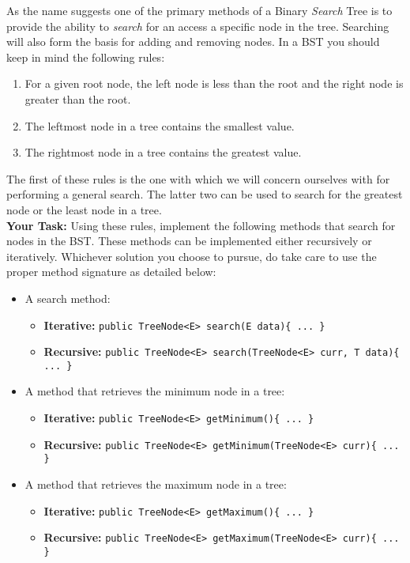 As the name suggests one of the primary methods  of a Binary \textit{Search}
Tree is to provide the ability to \textit{search} for an access a specific node
in the tree. Searching will also form the basis for adding and removing nodes.
In a BST you should keep in mind the following rules:
\begin{enumerate}
    \item For a given root node, the left node is less than the root and the right node is greater than the root.
    \item The leftmost node in a tree contains the smallest value.
    \item The rightmost node in a tree contains the greatest value.
\end{enumerate}
The first of these rules is the one with which we will concern ourselves with
for performing a general search. The latter two can be used to search for the
greatest node or the least node in a tree.\\

\textbf{Your Task: } Using these rules, implement the following methods that
search for nodes in the BST.  These methods can be implemented either
recursively or iteratively. Whichever solution you choose to pursue, do take
care to use the proper method signature as detailed below:
\begin{itemize}
    \item A search method:
    \begin{itemize}
        \item \textbf{Iterative:} \lstinline|public TreeNode<E> search(E data){ ... }|
        \item \textbf{Recursive:} \lstinline|public TreeNode<E> search(TreeNode<E> curr, T data){ ... }|
    \end{itemize}
    \item A method that retrieves the minimum node in a tree:
    \begin{itemize}
        \item \textbf{Iterative:} \lstinline|public TreeNode<E> getMinimum(){ ... }|
        \item \textbf{Recursive:} \lstinline|public TreeNode<E> getMinimum(TreeNode<E> curr){ ... }|
    \end{itemize}
    \item A method that retrieves the maximum node in a tree:
    \begin{itemize}
        \item \textbf{Iterative:} \lstinline|public TreeNode<E> getMaximum(){ ... }|
        \item \textbf{Recursive:} \lstinline|public TreeNode<E> getMaximum(TreeNode<E> curr){ ... }|
    \end{itemize}
\end{itemize}
